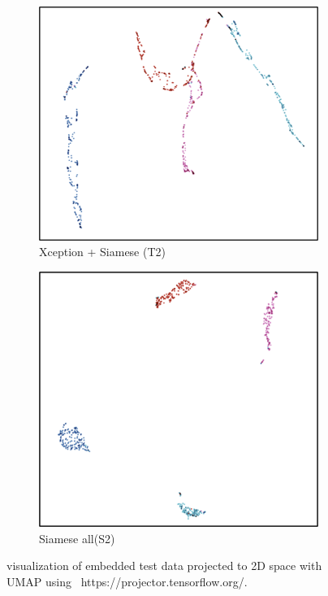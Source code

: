 \begin{figure}[h]
  \centering
  \begin{subfigure}[b]{0.48\linewidth}
  \includegraphics[width=\linewidth]{figs/umab_visualT2.png}
  \caption{Xception + Siamese (T2)}
  \label{fig:con_loss}
  \end{subfigure}
  \hfill
   \begin{subfigure}[b]{0.48\linewidth}
   \includegraphics[width=\linewidth]{figs/umab_visualS2.png}
   \caption{Siamese all(S2)}
   \label{fig:tri_loss}
  \end{subfigure}
    \hfill
    \caption{visualization of embedded test data projected to 2D space 	with UMAP using  https://projector.tensorflow.org/.}
    \label{fig:2Dprojection}
\end{figure}




